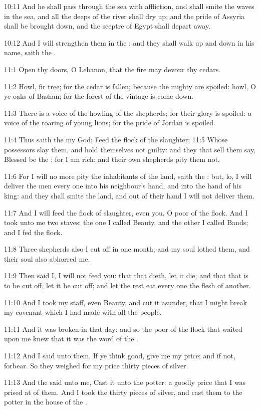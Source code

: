 10:11 And he shall pass through the sea with affliction, and shall smite the waves in the sea, and all the deeps of the river shall dry up: and the pride of Assyria shall be brought down, and the sceptre of Egypt shall depart away.

10:12 And I will strengthen them in the \LORD; and they shall walk up and down in his name, saith the \LORD.

11:1 Open thy doors, O Lebanon, that the fire may devour thy cedars.

11:2 Howl, fir tree; for the cedar is fallen; because the mighty are spoiled: howl, O ye oaks of Bashan; for the forest of the vintage is come down.

11:3 There is a voice of the howling of the shepherds; for their glory is spoiled: a voice of the roaring of young lions; for the pride of Jordan is spoiled.

11:4 Thus saith the \LORD my God; Feed the flock of the slaughter; 11:5 Whose possessors slay them, and hold themselves not guilty: and they that sell them say, Blessed be the \LORD; for I am rich: and their own shepherds pity them not.

11:6 For I will no more pity the inhabitants of the land, saith the \LORD: but, lo, I will deliver the men every one into his neighbour's hand, and into the hand of his king: and they shall smite the land, and out of their hand I will not deliver them.

11:7 And I will feed the flock of slaughter, even you, O poor of the flock. And I took unto me two staves; the one I called Beauty, and the other I called Bands; and I fed the flock.

11:8 Three shepherds also I cut off in one month; and my soul lothed them, and their soul also abhorred me.

11:9 Then said I, I will not feed you: that that dieth, let it die; and that that is to be cut off, let it be cut off; and let the rest eat every one the flesh of another.

11:10 And I took my staff, even Beauty, and cut it asunder, that I might break my covenant which I had made with all the people.

11:11 And it was broken in that day: and so the poor of the flock that waited upon me knew that it was the word of the \LORD.

11:12 And I said unto them, If ye think good, give me my price; and if not, forbear. So they weighed for my price thirty pieces of silver.

11:13 And the \LORD said unto me, Cast it unto the potter: a goodly price that I was prised at of them. And I took the thirty pieces of silver, and cast them to the potter in the house of the \LORD.

